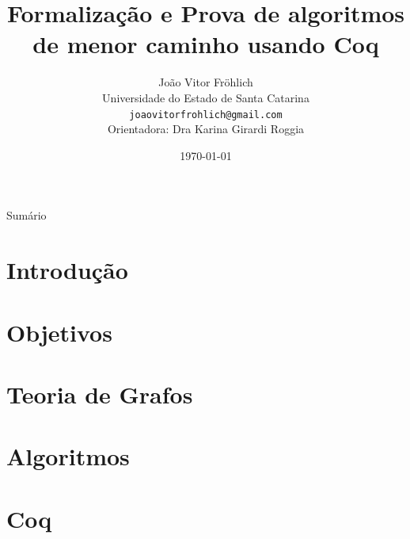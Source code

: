 \documentclass[xcolor=table]{beamer}
\title[]{Formalização e Prova de algoritmos de menor caminho usando Coq}
\author[João Vitor Fr\"ohlich]{
    João Vitor Fr\"ohlich\\\smallskip
    {\scriptsize Universidade do Estado de Santa Catarina \\\smallskip
    \vspace{-2mm}
    \texttt{joaovitorfrohlich@gmail.com}\\\medskip
    {Orientadora: Dra Karina Girardi Roggia}\\
    }
}
\date{\today}
\begin{document}
    \begin{frame}
        \titlepage
    \end{frame}

    \begin{frame}[allowframebreaks]{Sumário}
        \tableofcontents
    \end{frame}

    \section[]{Introdução}
    

    \section[]{Objetivos}
    
    


    \section[]{Teoria de Grafos}
    
    
    
    
    
    
    
    

    \section[]{Algoritmos}
    
    
    

    \section[]{Coq}
    
    
    
\end{document}

